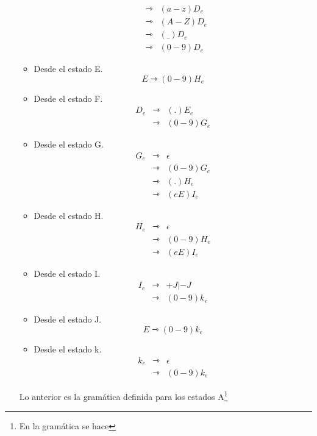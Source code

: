\begin{itemize}
\begin{multicols}{2}
\begin{itemize}
\begin{eqnarray*}
        &\rightarrowtriangle& (a-z)D_e\\
        &\rightarrowtriangle& (A-Z)D_e\\
        &\rightarrowtriangle& (\_)D_e\\
        &\rightarrowtriangle& (0-9)D_e
      \end{eqnarray*}
    \item Desde el estado E.
      \[E \rightarrowtriangle (0-9)H_e\]
    \item Desde el estado F.
      \begin{eqnarray*}
        D_e &\rightarrowtriangle& (.)E_e\\
        &\rightarrowtriangle& (0-9)G_e
      \end{eqnarray*}
    \item Desde el estado G.
      \begin{eqnarray*}
        G_e &\rightarrowtriangle& \epsilon\\
        &\rightarrowtriangle& (0-9)G_e\\
        &\rightarrowtriangle& (.)H_e\\
        &\rightarrowtriangle& (eE)I_e
      \end{eqnarray*}
    \item Desde el estado H.
      \begin{eqnarray*}
        H_e &\rightarrowtriangle& \epsilon\\
        &\rightarrowtriangle& (0-9)H_e\\
        &\rightarrowtriangle& (eE)I_e
      \end{eqnarray*}
    \item Desde el estado I.
      \begin{eqnarray*}
        I_e &\rightarrowtriangle& +J | -J\\
        &\rightarrowtriangle& (0-9)k_e
      \end{eqnarray*}
    \item Desde el estado J.
      \[E \rightarrowtriangle (0-9)k_e\]
    \item Desde el estado k.
      \begin{eqnarray*}
        k_e &\rightarrowtriangle& \epsilon\\
        &\rightarrowtriangle& (0-9)k_e
      \end{eqnarray*}
    \end{itemize}
  \end{multicols}
  Lo anterior es la gramática definida para los estados A\footnote{En la gramática se hace
}
\end{itemize}
